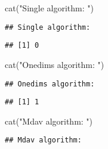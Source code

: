 \documentclass[
]{article}
\newenvironment{Shaded}{\begin{snugshade}}{\end{snugshade}}
\newcommand{\FunctionTok}[1]{\textcolor[rgb]{0.00,0.00,0.00}{#1}}
\newcommand{\NormalTok}[1]{#1}
\newcommand{\SpecialCharTok}[1]{\textcolor[rgb]{0.00,0.00,0.00}{#1}}
\newcommand{\StringTok}[1]{\textcolor[rgb]{0.31,0.60,0.02}{#1}}
\begin{document}
\begin{Shaded}
\begin{Highlighting}[]
\FunctionTok{cat}\NormalTok{(}\StringTok{"Single algorithm: "}\NormalTok{)}
\end{Highlighting}
\end{Shaded}

\begin{verbatim}
## Single algorithm:
\end{verbatim}

\begin{Shaded}
\end{Shaded}

\begin{verbatim}
## [1] 0
\end{verbatim}

\begin{Shaded}
\begin{Highlighting}[]
\FunctionTok{cat}\NormalTok{(}\StringTok{"Onedims algorithm: "}\NormalTok{)}
\end{Highlighting}
\end{Shaded}

\begin{verbatim}
## Onedims algorithm:
\end{verbatim}

\begin{Shaded}
\end{Shaded}

\begin{verbatim}
## [1] 1
\end{verbatim}

\begin{Shaded}
\begin{Highlighting}[]
\FunctionTok{cat}\NormalTok{(}\StringTok{"Mdav algorithm: "}\NormalTok{)}
\end{Highlighting}
\end{Shaded}

\begin{verbatim}
## Mdav algorithm:
\end{verbatim}
\end{document}
